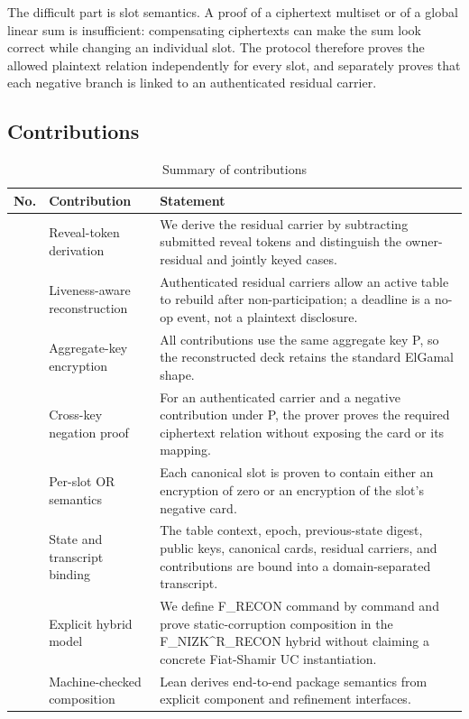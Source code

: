 \documentclass[11pt]{article}
\begin{document}
The difficult part is slot semantics. A proof of a ciphertext multiset or of a global linear sum is insufficient: compensating ciphertexts can make the sum look correct while changing an individual slot. The protocol therefore proves the allowed plaintext relation independently for every slot, and separately proves that each negative branch is linked to an authenticated residual carrier.

\subsection{Contributions}

\begin{table}[htbp]
\centering
\footnotesize
\caption{Summary of contributions}
\begin{tabularx}{\textwidth}{>{\RaggedRight}X >{\RaggedRight}X >{\RaggedRight}X}
\toprule
No. & Contribution & Statement \\
\midrule
1 & Reveal-token derivation & We derive the residual carrier by subtracting submitted reveal tokens and distinguish the owner-residual and jointly keyed cases. \\
2 & Liveness-aware reconstruction & Authenticated residual carriers allow an active table to rebuild after non-participation; a deadline is a no-op event, not a plaintext disclosure. \\
3 & Aggregate-key encryption & All contributions use the same aggregate key P, so the reconstructed deck retains the standard ElGamal shape. \\
4 & Cross-key negation proof & For an authenticated carrier and a negative contribution under P, the prover proves the required ciphertext relation without exposing the card or its mapping. \\
5 & Per-slot OR semantics & Each canonical slot is proven to contain either an encryption of zero or an encryption of the slot’s negative card. \\
6 & State and transcript binding & The table context, epoch, previous-state digest, public keys, canonical cards, residual carriers, and contributions are bound into a domain-separated transcript. \\
7 & Explicit hybrid model & We define F\_RECON command by command and prove static-corruption composition in the F\_NIZK\^{}R\_RECON hybrid without claiming a concrete Fiat-Shamir UC instantiation. \\
8 & Machine-checked composition & Lean derives end-to-end package semantics from explicit component and refinement interfaces. \\
\bottomrule
\end{tabularx}
\end{table}
\end{document}
